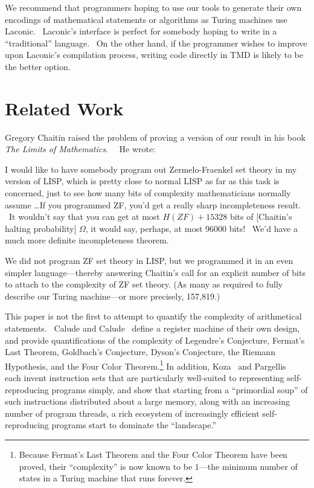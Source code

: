 \documentclass[11pt]{article}
\newcommand{\bbbitsperiod}{157,819.}
\begin{document}
We recommend that programmers hoping to use our tools to generate their own encodings of mathematical statements or algorithms as Turing machines use Laconic. \ Laconic's interface is perfect for somebody hoping to write in a ``traditional'' language. \ On the other hand, if the programmer wishes to improve upon Laconic's compilation process, writing code directly in TMD is likely to be the better option.

\section{Related Work}

Gregory Chaitin raised the problem of proving a version of our result in his book \emph{The Limits of Mathematics}.~\cite{chaitin} \ He wrote:

\begin{displayquote}
\noindent I would like to have somebody program out Zermelo-Fraenkel set theory in my version of LISP, which is pretty close to normal LISP as far as this task is concerned, just to see how many bits of complexity mathematicians normally assume \dots If you programmed ZF, you'd get a really sharp incompleteness result. \ It wouldn't say that you can get at most $H(ZF) + 15328$ bits of [Chaitin's halting probability] $\Omega$, it would say, perhaps, at most 96000 bits! \ We'd have a much more definite incompleteness theorem.
\end{displayquote}

We did not program ZF set theory in LISP, but we programmed it in an even simpler language---thereby answering Chaitin's call for an explicit number of bits to attach to the complexity of ZF set theory. (As many as required to fully describe our Turing machine---or more precisely, \bbbitsperiod)

This paper is not the first to attempt to quantify the complexity of arithmetical statements. \ Calude and Calude~\cite{calude} define a register machine of their own design, and provide quantifications of the complexity of Legendre's Conjecture, Fermat's Last Theorem, Goldbach's Conjecture, Dyson's Conjecture, the Riemann Hypothesis, and the Four Color Theorem.\footnote{Because Fermat's Last Theorem and the Four Color Theorem have been proved, their ``complexity'' is now known to be $1$---the minimum number of states in a Turing machine that runs forever.}
In addition, Koza~\cite{koza} and Pargellis~\cite{pargellis} each invent instruction sets that are particularly well-suited to representing self-reproducing programs simply, and show that starting from a ``primordial soup'' of such instructions distributed about a large memory, along with an increasing number of program threads, a rich ecosystem of increasingly efficient self-reproducing programs start to dominate the ``landscape.''
\end{document}
